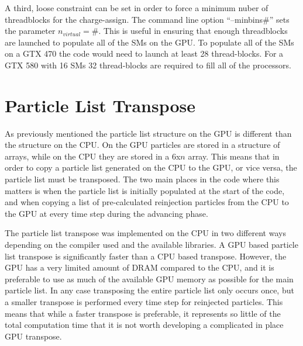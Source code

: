 A third, loose constraint can be set in order to force a minimum nuber of threadblocks for the charge-assign. The command line option ``--minbins\#'' sets the parameter $n_{virtual} = \#$. This is useful in ensuring that enough threadblocks are launched to populate all of the SMs on the GPU. To populate all of the SMs on a GTX 470 the code would need to launch at least 28 thread-blocks. For a GTX 580 with 16 SMs 32 thread-blocks are required to fill all of the processors.  

	\section{Particle List Transpose}
As previously mentioned the particle list structure on the GPU is different than the structure on the CPU. On the GPU particles are stored in a structure of arrays, while on the CPU they are stored in a 6x$n$ array. This means that in order to copy a particle list generated on the CPU to the GPU, or vice versa, the particle list must be transposed. The two main places in the code where this matters is when the particle list is initially populated at the start of the code, and when copying a list of pre-calculated reinjection particles from the CPU to the GPU at every time step during the advancing phase.

The particle list transpose was implemented on the CPU in two different ways depending on the compiler used and the available libraries. A GPU based particle list transpose is significantly faster than a CPU based transpose. However, the GPU has a very limited amount of DRAM compared to the CPU, and it is preferable to use as much of the available GPU memory as possible for the main particle list. In any case transposing the entire particle list only occurs once, but a smaller transpose is performed every time step for reinjected particles. This means that while a faster transpose is preferable, it represents so little of the total computation time that it is not worth developing a complicated in place GPU transpose.  

